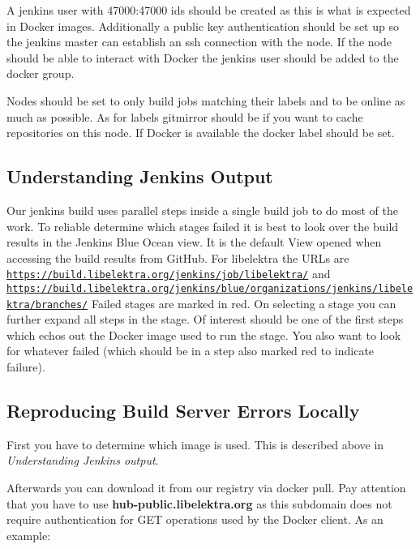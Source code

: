 A {\ttfamily jenkins} user with 47000\+:47000 ids should be created as this is what is expected in Docker images. Additionally a public key authentication should be set up so the jenkins master can establish an ssh connection with the node. If the node should be able to interact with Docker the jenkins user should be added to the {\ttfamily docker} group.

Nodes should be set to only build jobs matching their labels and to be online as much as possible. As for labels {\ttfamily gitmirror} should be if you want to cache repositories on this node. If Docker is available the {\ttfamily docker} label should be set.

\subsection*{Understanding Jenkins Output}

Our jenkins build uses parallel steps inside a single build job to do most of the work. To reliable determine which stages failed it is best to look over the build results in the Jenkins Blue Ocean view. It is the default View opened when accessing the build results from Git\+Hub. For libelektra the U\+R\+Ls are \href{https://build.libelektra.org/jenkins/job/libelektra/}{\tt https\+://build.\+libelektra.\+org/jenkins/job/libelektra/} and \href{https://build.libelektra.org/jenkins/blue/organizations/jenkins/libelektra/branches/}{\tt https\+://build.\+libelektra.\+org/jenkins/blue/organizations/jenkins/libelektra/branches/} Failed stages are marked in red. On selecting a stage you can further expand all steps in the stage. Of interest should be one of the first steps which echos out the Docker image used to run the stage. You also want to look for whatever failed (which should be in a step also marked red to indicate failure).

\subsection*{Reproducing Build Server Errors Locally}

First you have to determine which image is used. This is described above in {\itshape Understanding Jenkins output}.

Afterwards you can download it from our registry via {\ttfamily docker pull}. Pay attention that you have to use {\bfseries hub-\/public.\+libelektra.\+org} as this subdomain does not require authentication for G\+ET operations used by the Docker client. As an example\+:


